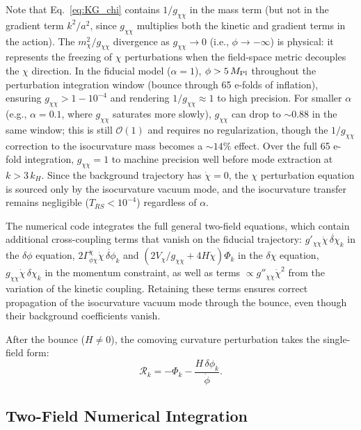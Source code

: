 \documentclass[11pt,a4paper]{article}
\begin{document}
Note that Eq.~\eqref{eq:KG_chi} contains $1/g_{\chi\chi}$ in the mass term (but not in the gradient term $k^2/a^2$, since $g_{\chi\chi}$ multiplies both the kinetic and gradient terms in the action). The $m_\chi^2/g_{\chi\chi}$ divergence as $g_{\chi\chi} \to 0$ (i.e., $\phi \to -\infty$) is physical: it represents the freezing of $\chi$ perturbations when the field-space metric decouples the $\chi$ direction. In the fiducial model ($\alpha = 1$), $\phi > 5\,M_{\rm Pl}$ throughout the perturbation integration window (bounce through 65 e-folds of inflation), ensuring $g_{\chi\chi} > 1 - 10^{-4}$ and rendering $1/g_{\chi\chi} \approx 1$ to high precision. For smaller $\alpha$ (e.g., $\alpha = 0.1$, where $g_{\chi\chi}$ saturates more slowly), $g_{\chi\chi}$ can drop to $\sim 0.88$ in the same window; this is still $\mathcal{O}(1)$ and requires no regularization, though the $1/g_{\chi\chi}$ correction to the isocurvature mass becomes a $\sim 14\%$ effect. Over the full 65 e-fold integration, $g_{\chi\chi} = 1$ to machine precision well before mode extraction at $k > 3\,k_H$. Since the background trajectory has $\dot\chi = 0$, the $\chi$ perturbation equation is sourced only by the isocurvature vacuum mode, and the isocurvature transfer remains negligible ($T_{RS} < 10^{-4}$) regardless of $\alpha$.

The numerical code integrates the full general two-field equations, which contain additional cross-coupling terms that vanish on the fiducial trajectory: $g'_{\chi\chi}\dot\chi\,\dot{\delta\chi}_k$ in the $\delta\phi$ equation, $2\Gamma^\chi_{\phi\chi}\dot\chi\,\dot{\delta\phi}_k$ and $(2V_\chi/g_{\chi\chi} + 4H\dot\chi)\Phi_k$ in the $\delta\chi$ equation, $g_{\chi\chi}\dot\chi\,\delta\chi_k$ in the momentum constraint, as well as terms $\propto g''_{\chi\chi}\dot\chi^2$ from the variation of the kinetic coupling. Retaining these terms ensures correct propagation of the isocurvature vacuum mode through the bounce, even though their background coefficients vanish.

After the bounce ($H \neq 0$), the comoving curvature perturbation takes the single-field form:
\begin{equation}
\mathcal{R}_k = -\Phi_k - \frac{H\,\delta\phi_k}{\dot\phi}.
\label{eq:R_reconstruct}
\end{equation}

\subsection{Two-Field Numerical Integration}
\end{document}
